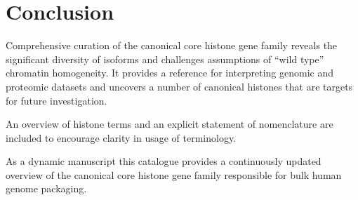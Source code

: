 \section{Conclusion}

	Comprehensive curation of the canonical core histone gene family 
	reveals the significant diversity of isoforms 
	and challenges assumptions of ``wild type'' chromatin homogeneity.
	It provides a reference for interpreting genomic and proteomic datasets
	and uncovers a number of canonical histones that are targets for future investigation.

	An overview of histone terms and an explicit statement of nomenclature 
	are included to encourage clarity in usage of terminology.

	As a dynamic manuscript this catalogue provides a continuously updated overview 
	of the canonical core histone gene family responsible for bulk human genome packaging.